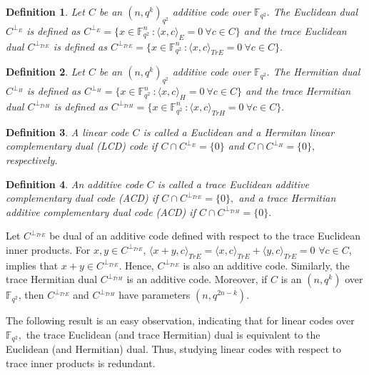 \documentclass[sn-mathphys-num]{sn-jnl}%
\theoremstyle{thmstyleone}%
\theoremstyle{thmstyletwo}%
\theoremstyle{thmstylethree}%
\newtheorem{definition}{Definition}%
\begin{document}
\begin{definition}
	Let $C$ be an $(n,q^k)_{q^2}$ additive code over $\mathbb{F}_{q^2}.$ The  \textit{Euclidean dual} $C^{\perp_{E}}$ is defined as $C^{\perp_{E}}=\{x\in \mathbb{F}_{q^2}^n \ : \langle x ,c\rangle_{E}=0\ \forall c\in C\}$  and the \textit{trace Euclidean dual} $C^{\perp_{TrE}}$ is defined as $C^{\perp_{TrE}}=\{x\in \mathbb{F}_{q^2}^n \ : \langle x ,c\rangle_{TrE}=0\ \forall c\in C\}.$ 
\end{definition}

\begin{definition}
	Let $C$ be an $(n,q^k)_{q^2}$ additive code over $\mathbb{F}_{q^2}.$ The \textit{Hermitian dual} $C^{\perp_{H}}$ is defined as $C^{\perp_{H}}=\{x\in \mathbb{F}_{q^2}^n \ : \langle x ,c\rangle_{H}=0\ \forall c\in C\}$ and the \textit{trace Hermitian dual} $C^{\perp_{TrH}}$ is defined as $C^{\perp_{TrH}}=\{x\in \mathbb{F}_{q^2}^n \ : \langle x ,c\rangle_{TrH}=0\ \forall c\in C\}.$ 
\end{definition}
\begin{definition}
	A linear code $C$ is called a Euclidean and a Hermitan linear  complementary dual (LCD) code if $C\cap C^{\perp_E}=\{0\}$ and  $C\cap C^{\perp_H}=\{0\},$ respectively.
\end{definition}
\begin{definition}
	An additive code $C$ is called a \textit{trace Euclidean additive complementary dual code} (ACD)  if $C\cap C^{\perp_{TrE}}=\{0\},$ and a \textit{trace Hermitian additive complementary dual code} (ACD) if $C\cap C^{\perp_{TrH}}=\{0\}.$
\end{definition}

Let $C^{\perp_{TrE}}$ be dual of an additive code defined with respect to the trace Euclidean  inner products. For $x,y\in C^{\perp_{TrE}}$,  $\langle x+y,c\rangle_{TrE}=\langle x,c\rangle_{TrE}+\langle y,c\rangle_{TrE}=0$ $\forall c\in C$, implies that $x+y\in C^{\perp_{TrE}}$. Hence, $C^{\perp_{TrE}}$ is also an additive code. Similarly, the trace Hermitian dual $C^{\perp_{TrH}}$ is an additive code. Moreover, if $C$ is an   $(n, q^k)$ over $\mathbb{F}_{q^2}$, then  $C^{\perp_{TrE}}$ and $C^{\perp_{TrH}}$ have parameters $(n, q^{2n-k})$.


The following result is an easy observation, indicating that for linear codes over $\mathbb{F}_{q^2},$ the trace Euclidean (and trace Hermitian) dual is equivalent to the Euclidean (and Hermitian) dual. Thus, studying linear codes with respect to trace inner products is redundant.
\end{document}
